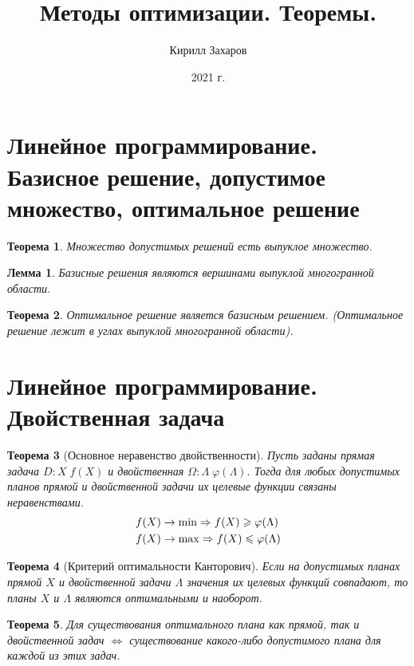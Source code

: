 \documentclass[12pt]{article}
\title{Методы оптимизации. Теоремы.}
\author{Кирилл Захаров}
\date{2021 г.}
\newtheorem{lemma}{Лемма}[section]
\newtheorem{theorem}{Теорема}[section]
\theoremstyle{definition}
\theoremstyle{remark}
\begin{document}
\maketitle
\tableofcontents

\section{Линейное программирование. Базисное решение, допустимое множество, оптимальное решение}

\begin{theorem}
  Множество допустимых решений есть выпуклое множество.
\end{theorem}
\begin{lemma}
  Базисные решения являются вершинами выпуклой многогранной области.
\end{lemma}
\begin{theorem}
  Оптимальное решение является базисным решением. (Оптимальное решение лежит в углах выпуклой многогранной области).
\end{theorem}
\section{Линейное программирование. Двойственная задача}

\begin{theorem}[Основное неравенство двойственности]
  Пусть заданы прямая задача $D: X\;f(X)$ и двойственная $\Omega :\Lambda\;\varphi(\Lambda)$. Тогда для любых допустимых планов прямой и двойственной задачи их целевые функции связаны неравенствами.
  \begin{align}
    &f(X)\to\min \Rightarrow f(X)\geqslant \varphi (\Lambda)\\
    &f(X)\to\max \Rightarrow f(X)\leqslant \varphi (\Lambda)\notag
  \end{align}
\end{theorem}
\begin{theorem}[Критерий оптимальности Канторович]
  Если на допустимых планах прямой  $X$ и двойственной задачи $\Lambda$ значения их целевых функций совпадают, то планы  $X$ и $\Lambda$ являются оптимальными и наоборот.
\end{theorem}

\begin{theorem}
Для существования оптимального плана как прямой, так и двойственной задач $\iff$ существование какого-либо допустимого плана для каждой из этих задач.
\end{theorem}
\end{document}
